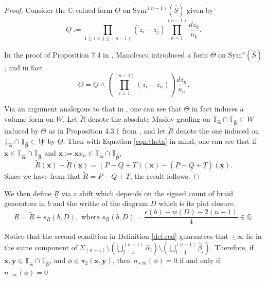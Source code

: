\documentclass[11pt]{article}
\theoremstyle{plain} \newtheorem{thm}{Theorem}[subsection]
\theoremstyle{plain} \newtheorem{cor}[thm]{Corollary}
\theoremstyle{plain} \newtheorem{prop}[thm]{Proposition}
\theoremstyle{plain} \newtheorem{conj}[thm]{Conjecture}
\theoremstyle{plain} \newtheorem{lem}[thm]{Lemma}
\theoremstyle{definition} \newtheorem{df}[thm]{Definition}
\theoremstyle{remark} \newtheorem{rmk}[thm]{Remark}
\theoremstyle{remark} \newtheorem{obs}[thm]{Observation}
\newcommand{\tld}[1]{\widetilde{#1}}
\newcommand{\red}[1]{\underline{#1}}
\newcommand{\ah}{\widehat{\alpha}}
\newcommand{\bh}{\widehat{\beta}}
\newcommand{\ba}{\boldsymbol{\alpha}}
\newcommand{\bb}{\boldsymbol{\beta}}
\newcommand{\bah}{\widehat{\ba}}
\newcommand{\bbh}{\widehat{\bb}}
\newcommand{\Tah}{\mathbb{T}_{\bah}}
\newcommand{\Tbh}{\mathbb{T}_{\bbh}}
\newcommand{\Tahr}{\red{\mathbb{T}}_{\bah}}
\newcommand{\Tbhr}{\red{\mathbb{T}}_{\bbh}}
\newcommand{\bx}{\mathbf{x}}
\newcommand{\by}{\mathbf{y}}
\numberwithin{equation}{section}
\begin{document}
\begin{proof}
Consider the $\mathbb{C}$-valued form $\red{\Theta}$ on $\text{Sym}^{(n-1)}(\widehat{S})$ given by 
\begin{equation}\label{eqn:vol}
\red{\Theta} := \prod_{1 \leq i < j \leq (n-1)} (z_i - z_j) \prod_{k = 1}^{(n-1)} \frac{dz_k}{u_k}.
\end{equation}

In the proof of Proposition 7.4 in \cite{cm:R}, Manolescu introduced a form $\Theta$ on $\text{Sym}^{n}(\widehat{S})$, and in fact
\begin{equation}\label{eqn:theta}
\Theta =\red{\Theta} \wedge  \left( \prod_{i = 1}^{(n-1)} (z_i - z_n) \right) \frac{dz_n}{u_n}.
\end{equation}

Via an argument analogous to that in \cite{cm:R}, one can see that $\red{\Theta}$ in fact induces a volume form on $\red{W}$.  Let $\tld{R}$ denote the absolute Maslov grading on $\Tah \cap \Tbh \subset W$ induced by $\Theta$ as in Proposition 4.3.1 from \cite{et:R}, and let $\red{\tld{R}}$ denote the one induced on $\Tahr \cap \Tbhr \subset \red{W}$ by $\red{\Theta}$.  Then with Equation \ref{eqn:theta} in mind, one can see that if $\red{\bx} \in \Tahr \cap \Tbhr$ and $\bx := \red{\bx}x_n \in  \Tah \cap \Tbh$,
$$ \tld{R}(\bx) - \red{\tld{R}}(\red{\bx}) = \left( P-Q+T\right)(\bx) - \left( \red{P}-\red{Q}+\red{T}\right)(\red{\bx}).$$
Since we have from \cite{et:R} that $\tld{R} = P - Q +T$, the result follows.
\end{proof}

We then define $\red{R}$ via a shift which depends on the signed count of braid generators in $b$ and the writhe of the diagram $D$ which is its plat closure.
\begin{equation*}
\red{R} = \red{\tld{R}} + s_{\red{R}}(b,D),\text{ where } s_{\red{R}}(b,D) = \frac{\epsilon(b) - w(D) - 2(n-1)}{4} \in \mathbb{Q}.
\end{equation*}

Notice that the second condition in Definition \ref{def:red} guarantees that $\pm\infty$ lie in the same component of $\displaystyle\Sigma_{(n-1)} \setminus \left( \bigcup_{i=1}^{(n-1)} \ah_{i} \right) \setminus \left( \bigcup_{i=1}^{(n-1)} \bh_{i} \right).$
Therefore, if $\bx, \by \in \Tahr \cap \Tbhr$, and $\phi \in \pi_{2}(\bx, \by)$, then $n_{+\infty}(\phi)=0$ if and only if $n_{-\infty}(\phi)=0$
\end{document}
